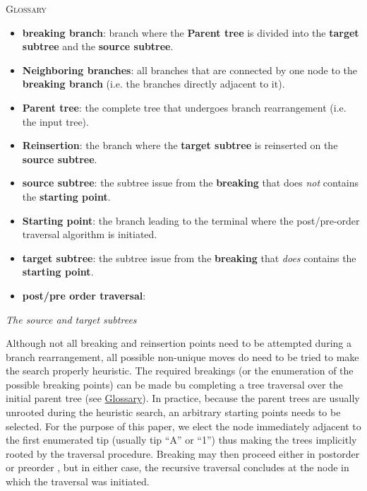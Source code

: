 \documentclass[12pt,letterpaper]{article}
\renewcommand{\section}[1]{%
\bigskip
\begin{center}
\begin{Large}
\normalfont\scshape #1
\medskip
\end{Large}
\end{center}}
\renewcommand{\subsection}[1]{%
\bigskip
\begin{center}
\begin{large}
\normalfont\itshape #1
\end{large}
\end{center}}
\begin{document}
\section{Glossary}
\label{Glossary}

\begin{itemize}
    \item{\textbf{breaking branch}: branch where the \textbf{Parent tree} is divided into the \textbf{target subtree} and the \textbf{source subtree}.}
    \item{\textbf{Neighboring branches}: all branches that are connected by one node to the \textbf{breaking branch} (i.e. the branches directly adjacent to it).}
    \item{\textbf{Parent tree}: the complete tree that undergoes branch rearrangement (i.e. the input tree).}
    \item{\textbf{Reinsertion}: the branch where the \textbf{target subtree} is reinserted on the \textbf{source subtree}.}
    \item{\textbf{source subtree}: the subtree issue from the \textbf{breaking} that does \textit{not} contains the \textbf{starting point}.}
    \item{\textbf{Starting point}: the branch leading to the terminal where the post/pre-order traversal algorithm is initiated.}
    \item{\textbf{target subtree}: the subtree issue from the \textbf{breaking} that \textit{does} contains the \textbf{starting point}.}
    \item{\textbf{post/pre order traversal}: }
\end{itemize}

\subsection{The source and target subtrees}
Although not all breaking and reinsertion points need to be attempted during a branch rearrangement, all possible non-unique moves do need to be tried to make the search properly heuristic. 
The required breakings (or the enumeration of the possible breaking points) can be made bu completing a tree traversal over the initial parent tree (see \hyperref[Glossary]{Glossary}).
In practice, because the parent trees are usually unrooted during the heuristic search, an arbitrary starting points needs to be selected.
For the purpose of this paper, we elect the node immediately adjacent to the first enumerated tip (usually tip ``A'' or ``1'') thus making the trees implicitly rooted by the traversal procedure.
Breaking may then proceed either in postorder or preorder %
, but in either case, the recursive traversal concludes at the node in which the traversal was initiated.
\end{document}
